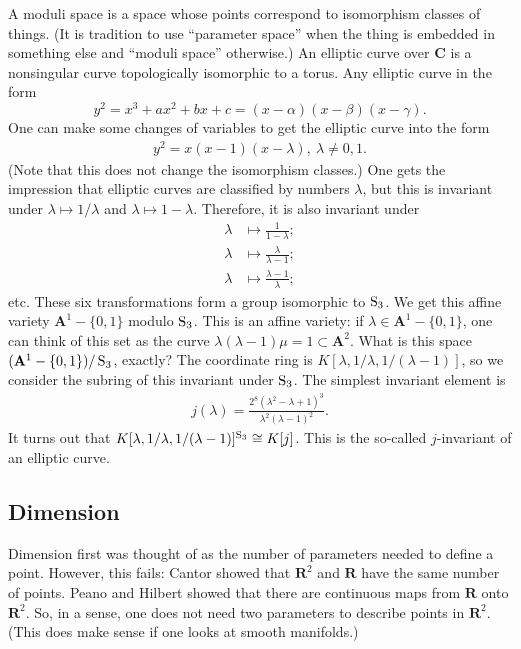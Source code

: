 \documentclass[11pt, oneside,margin=1in]{article}
\begin{document}
\fi
\begin{example}\label{}\text{}
A moduli space is a space whose points correspond to isomorphism classes of things. (It is tradition to use ``parameter space'' when the thing is embedded in something else and ``moduli space'' otherwise.) An elliptic curve over $\mathbf{C}$ is a nonsingular curve topologically isomorphic to a torus. Any elliptic curve in the form \[ y^2=x^3+ax^2+bx+c = (x-\alpha) (x-\beta) (x-\gamma).\] One can make some changes of variables to get the elliptic curve into the form
\begin{align*}
	y^2 = x(x-1) (x-\lambda),\ \lambda \ne 0,1.
\end{align*}
(Note that this does not change the isomorphism classes.) One gets the impression that elliptic curves are classified by numbers $\lambda$, but this is invariant under $\lambda\longmapsto 1/\lambda$ and $\lambda \longmapsto 1-\lambda$. Therefore, it is also invariant under
\begin{align*}
	\lambda &\longmapsto \frac{1}{1-\lambda};\\
	\lambda&\longmapsto \frac{\lambda}{\lambda-1};\\
	\lambda&\longmapsto \frac{\lambda-1}{\lambda};
\end{align*}
etc. These six transformations form a group isomorphic to $\operatorname{S}_3$. We get this affine variety $\mathbf{A}^1 - \{0,1\}$ modulo $\operatorname{S}_3$. This is an affine variety: if $\lambda\in \mathbf{A}^1-\{0,1\}$, one can think of this set as the curve $\lambda(\lambda-1)\mu = 1\subset\mathbf{A}^2$. What is this space $(\mathbf{A}^1 - \{0,1\}) / \operatorname{S}_3$, exactly? The coordinate ring is $K[\lambda, 1/\lambda, 1/(\lambda-1)]$, so we consider the subring of this invariant under $\operatorname{S}_3$. The simplest invariant element is 
\begin{align*}
	j(\lambda) =  \frac{2^8(\lambda^2-\lambda+1)^3}{\lambda^2(\lambda-1)^2}.
\end{align*}
It turns out that $K[\lambda, 1/\lambda, 1/(\lambda-1)]^{\operatorname{S}_3} \cong K[j]$. This is the so-called $j$-invariant of an elliptic curve.
\end{example}


\subsection{Dimension}

Dimension first was thought of as the number of parameters needed to define a point. However, this fails: Cantor showed that $\mathbf{R}^2$ and $\mathbf{R}$ have the same number of points. Peano and Hilbert showed that there are continuous maps from $\mathbf{R}$ onto $\mathbf{R}^2$. So, in a sense, one does not need two parameters to describe points in $\mathbf{R}^2$. (This does make sense if one looks at smooth manifolds.)
\end{document}
